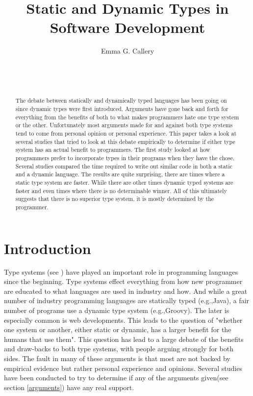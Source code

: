 \documentclass{sig-alternate}
\begin{document}
\title{Static and Dynamic Types in Software Development}
\author{
\alignauthor
Emma G. Callery\\
	\\
	\\
	\\
}

\maketitle

\begin{abstract}
The debate between statically and dynamically typed languages has been going on since dynamic types were first introduced. Arguments have gone back and forth for everything from the benefits of both to what makes programmers hate one type system or the other. Unfortunately most arguments made for and against both type systems tend to come from personal opinion or personal experience. 
This paper takes a look at several studies that tried to look at this debate empirically to determine if either type system has an actual benefit to programmers. The first study looked at how programmers prefer to incorporate types in their programs when they have the chose. Several studies compared the time required to write out similar code in both a static and a dynamic language. 
The results are quite surprising, there are times where a static type system are faster. While there are other times dynamic typed systems are faster and even times where there is no determinable winner. All of this ultimately suggests that there is no superior type system, it is mostly determined by the programmer.  
\end{abstract}


\section{Introduction}
Type systems (see \citep{Pierce2002}) have played an important role in programming languages since the beginning. Type systems effect everything from how new programmer are educated to what languages are used in industry and how. And while a great number of industry programming languages are statically typed (e.g.,Java), a fair number of programs use a dynamic type system (e.g.,Groovy). The later is especially common is web developments. This leads to the question of "whether one system or another, either static or dynamic, has a larger benefit for the humans that use them"\cite{Mayer2012}. This question has lead to a large debate of the benefits and draw-backs to both type systems, with people arguing strongly for both sides. The fault in many of these arguments is that most are not backed by empirical evidence but rather personal experience and opinions. Several studies have been conducted to try to determine if any of the arguments given(see section \ref{arguments}) have any real support.
\end{document}
